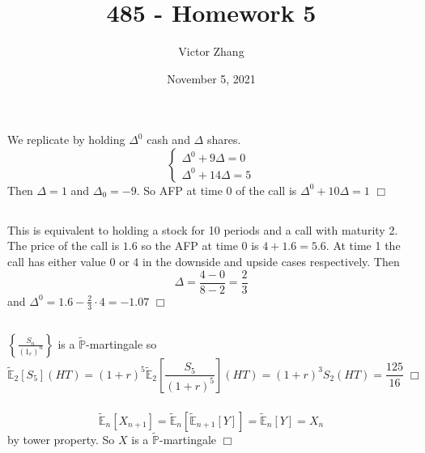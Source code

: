 \documentclass{article}
\title{485 - Homework 5}
\author{Victor Zhang}
\date{November 5, 2021}
\begin{document}
\maketitle

\section{}
\subsection{}
We replicate by holding $\Delta^0$ cash and $\Delta$ shares.
\begin{equation*}
\begin{cases}
\Delta^0 + 9 \Delta = 0\\
\Delta^0 + 14 \Delta = 5
\end{cases}
\end{equation*}
Then $\Delta = 1$ and $\Delta_0 = -9$. So AFP at time 0 of the call is $\Delta^0 + 10\Delta = 1$ $\Box$

\subsection{}
This is equivalent to holding a stock for 10 periods and a call with maturity 2. The price of the call is $1.6$ so the AFP at time 0 is $4 + 1.6 = 5.6$. At time 1 the call has either value 0 or 4 in the downside and upside cases respectively. Then
$$\Delta = \frac{4 - 0}{8 - 2} = \frac{2}{3}$$
and $\Delta^0 = 1.6 - \frac{2}{3} \cdot 4 = -1.07$ $\Box$

\subsection{}
\subsubsection{}
$\left\{\frac{S_n}{(1_r)^n}\right\}$ is a $\widetilde{\mathbb{P}}$-martingale so
$$\widetilde{\mathbb{E}}_2[S_5](HT) = (1+r)^5 \widetilde{\mathbb{E}}_2[\frac{S_5}{(1 + r)^5}](HT) = (1+r)^3 S_2(HT) = \frac{125}{16} \; \Box$$

\subsubsection{}
$$\widetilde{\mathbb{E}}_n[X_{n+1}] = \widetilde{\mathbb{E}}_n[\widetilde{\mathbb{E}}_{n+1}[Y]] = \widetilde{\mathbb{E}}_n[Y] = X_n$$
by tower property. So $X$ is a $\widetilde{\mathbb{P}}$-martingale $\Box$
\end{document}
